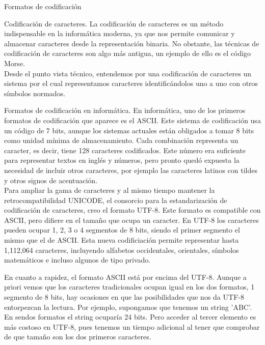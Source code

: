 	
	\begin{section}{Formatos de codificaci\'on}
		\begin{subsection}{Codificación de caracteres.}
			La codificación de caracteres es un método indispensable en la informática moderna, ya que nos permite comunicar y almacenar caracteres desde la representación binaria. No obstante, las técnicas de codificación de caracteres son algo más antigua, un ejemplo de ello es el código Morse. \\
			
			Desde el punto vista técnico, entendemos por una codificación de caracteres un sistema por el cual representamos caracteres identificándolos uno a uno con otros símbolos normados. 
		\end{subsection}
		
		\begin{subsection}{Formatos de codificación en informática.}
			En informática, uno de los primeros formatos de codificación que aparece es el ASCII. Este sistema de codificación usa un código de 7 bits, aunque los sistemas actuales están obligados a tomar 8 bits como unidad mínima de almacenamiento. Cada combinación representa un caracter, es decir, tiene 128 caracteres codificados. Este número era suficiente para representar textos en inglés y números, pero pronto quedó expuesta la necesidad de incluir otros caracteres, por ejemplo las caracteres latinos con tildes y otros signos de acentuación. \\
			
			Para ampliar la gama de caracteres y al mismo tiempo mantener la retrocompatibilidad UNICODE\cite{unicode}, el consorcio para la estandarización de codificación de caracteres, creo el formato UTF-8. Este formato es compatible con ASCII, pero difiere en el tamaño que ocupa un caracter. En UTF-8 los caracteres pueden ocupar 1, 2, 3 o 4 segmentos de 8 bits, siendo el primer segmento el mismo que el de ASCII.  Esta nueva codificiación permite representar hasta 1,112,064 caracteres, incluyendo alfabetos occidentales, orientales, símbolos matemáticos e incluso algunos de tipo privado.
			
			En cuanto a rapidez, el formato ASCII está por encima del UTF-8. Aunque a priori vemos que los caracteres tradicionales ocupan igual en los dos formatos, 1 segmento de 8 bits, hay ocasiones en que las posibilidades que nos da UTF-8 entorpezcan la lectura. Por ejemplo, supongamos que tenemos un string 'ABC'. En sendos formatos el string ocuparía 24 bits. Pero acceder al tercer elemento es más costoso en UTF-8, pues tenemos un tiempo adicional al tener que comprobar de que tamaño son los dos primeros caracteres.  \\
			

\end{subsection}
\end{section}
